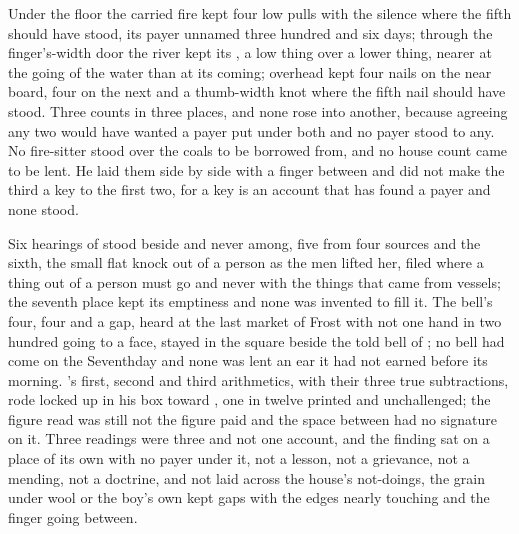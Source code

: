 Under the floor the carried fire kept four low pulls with the silence where the fifth should have stood, its payer unnamed three hundred and six days; through the finger's-width door the river kept its , a low thing over a lower thing, nearer at the going of the water than at its coming; overhead  kept four nails on the near board, four on the next and a thumb-width knot where the fifth nail should have stood. Three counts in three places, and none rose into another, because agreeing any two would have wanted a payer put under both and no payer stood to any. No fire-sitter stood over the coals to be borrowed from, and no house count came to be lent. He laid them side by side with a finger between and did not make the third a key to the first two, for a key is an account that has found a payer and none stood.

\scenebreak

Six hearings of  stood beside and never among, five from four sources and the sixth, the small flat knock out of a person as the men lifted her, filed where a thing out of a person must go and never with the things that came from vessels; the seventh place kept its emptiness and none was invented to fill it. The bell's four, four and a gap, heard at the last market of Frost with not one hand in two hundred going to a face, stayed in the square beside the told bell of ; no bell had come on the Seventhday and none was lent an ear it had not earned before its morning. 's first, second and third arithmetics, with their three true subtractions, rode locked up  in his box toward , one in twelve printed and unchallenged; the figure read was still not the figure paid and the space between had no signature on it. Three readings were three and not one account, and the finding sat on a place of its own with no payer under it, not a lesson, not a grievance, not a mending, not a doctrine, and not laid across the house's not-doings, the grain under wool or the boy's own kept gaps with the edges nearly touching and the finger going between.

